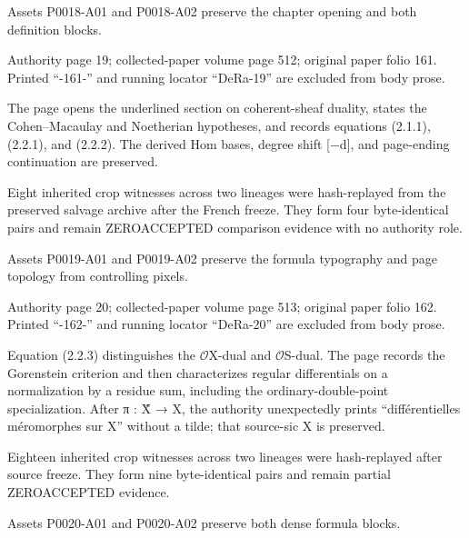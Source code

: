 \documentclass[11pt,a4paper]{article}
\begin{document}
Assets P0018-A01 and P0018-A02 preserve the chapter opening and both definition blocks.


\par\medskip
\hypertarget{D018-P0019}{}
\par\smallskip
Authority page 19; collected-paper volume page 512; original paper folio 161. Printed “-161-” and running locator “DeRa-19” are excluded from body prose.

The page opens the underlined section on coherent-sheaf duality, states the Cohen–Macaulay and Noetherian hypotheses, and records equations (2.1.1), (2.2.1), and (2.2.2). The derived Hom bases, degree shift [−d], and page-ending continuation are preserved.

Eight inherited crop witnesses across two lineages were hash-replayed from the preserved salvage archive after the French freeze. They form four byte-identical pairs and remain ZERO\textunderscore{}ACCEPTED comparison evidence with no authority role.

Assets P0019-A01 and P0019-A02 preserve the formula typography and page topology from controlling pixels.


\par\medskip
\hypertarget{D018-P0020}{}
\par\smallskip
Authority page 20; collected-paper volume page 513; original paper folio 162. Printed “-162-” and running locator “DeRa-20” are excluded from body prose.

Equation (2.2.3) distinguishes the \ensuremath{\mathcal{O}}\textunderscore{}X-dual and \ensuremath{\mathcal{O}}\textunderscore{}S-dual. The page records the Gorenstein criterion and then characterizes regular differentials on a normalization by a residue sum, including the ordinary-double-point specialization. After π : X̃ → X, the authority unexpectedly prints “différentielles méromorphes sur X” without a tilde; that source-sic X is preserved.

Eighteen inherited crop witnesses across two lineages were hash-replayed after source freeze. They form nine byte-identical pairs and remain partial ZERO\textunderscore{}ACCEPTED evidence.

Assets P0020-A01 and P0020-A02 preserve both dense formula blocks.
\end{document}
